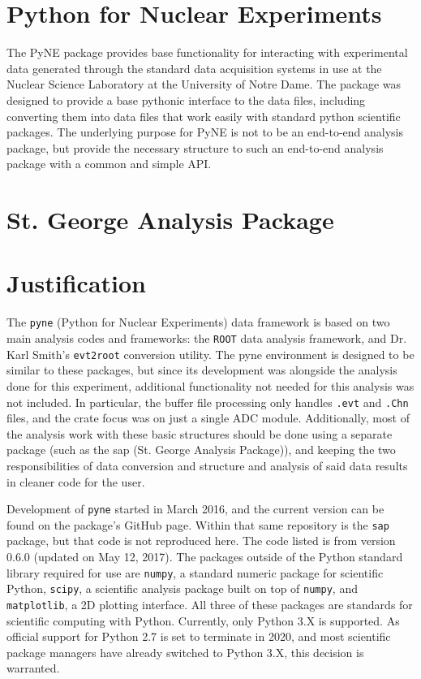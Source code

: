 \section{Python for Nuclear Experiments}

The PyNE package provides base functionality for interacting with
experimental data generated through the standard data acquisition
systems in use at the Nuclear Science Laboratory at the University of
Notre Dame. The package was designed to provide a base pythonic
interface to the data files, including converting them into data files
that work easily with standard python scientific packages. The
underlying purpose for PyNE is not to be an end-to-end analysis package,
but provide the necessary structure to such an end-to-end analysis
package with a common and simple API.


\section{St. George Analysis Package}


\section{Justification}

The \texttt{pyne} (Python for Nuclear Experiments) data framework is
based on two main analysis codes and frameworks: the \texttt{ROOT} data
analysis framework, and Dr. Karl Smith's \texttt{evt2root} conversion
utility. The pyne environment is designed to be similar to these
packages, but since its development was alongside the analysis done for
this experiment, additional functionality not needed for this analysis
was not included. In particular, the buffer file processing only handles
\texttt{.evt} and \texttt{.Chn} files, and the crate focus was on just a
single ADC module. Additionally, most of the analysis work with these
basic structures should be done using a separate package (such as the
sap (St. George Analysis Package)), and keeping the two responsibilities
of data conversion and structure and analysis of said data results in
cleaner code for the user.

Development of \texttt{pyne} started in March 2016, and the current
version can be found on the package's GitHub page. Within that same
repository is the \texttt{sap} package, but that code is not reproduced
here. The code listed is from version 0.6.0 (updated on May 12, 2017).
The packages outside of the Python standard library required for use are
\texttt{numpy}, a standard numeric package for scientific Python,
\texttt{scipy}, a scientific analysis package built on top of
\texttt{numpy}, and \texttt{matplotlib}, a 2D plotting interface. All
three of these packages are standards for scientific computing with
Python. Currently, only Python 3.X is supported. As official support for
Python 2.7 is set to terminate in 2020, and most scientific package
managers have already switched to Python 3.X, this decision is
warranted.
